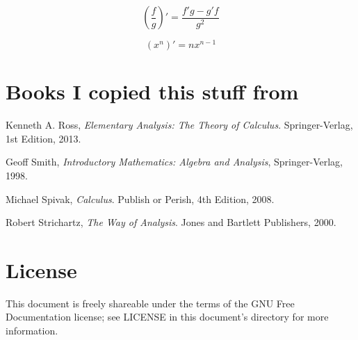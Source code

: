 \documentclass{article}
\theoremstyle{definition}
\begin{document}
\begin{equation}
\left(\frac{f}{g}\right)' = \frac{f'g - g'f}{g^2}
\end{equation}

\begin{equation}
(x^n)' = nx^{n-1}
\end{equation}

\section{Books I copied this stuff from} \label{bibliography}

\begin{thebibliography}{9}

  Kenneth A. Ross,
  \emph{Elementary Analysis: The Theory of Calculus}.
  Springer-Verlag,
  1st Edition,
  2013.

  Geoff Smith,
  \emph{Introductory Mathematics: Algebra and Analysis},
  Springer-Verlag,
  1998.

  Michael Spivak,
  \emph{Calculus}.
  Publish or Perish,
  4th Edition,
  2008.

  Robert Strichartz,
  \emph{The Way of Analysis}.
  Jones and Bartlett Publishers,
  2000.
  
\end{thebibliography}

\section{License}

This document is freely shareable under the terms of the GNU Free Documentation
license; see LICENSE in this document's directory for more information.
\end{document}
